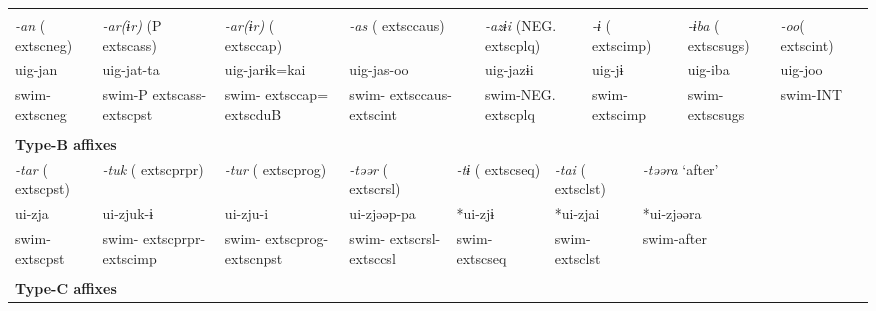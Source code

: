 \tabletail{}
\tablelasttail{}
\begin{tabularx}{\textwidth}{XXXXXXXXXXXXXXXXXXXX}
\lsptoprule
\multicolumn{20}{X}{{\bfseries Type-A affixes}}\\
{ \textit{{}-an} (	extsc{neg})} & \multicolumn{3}{X}{{ \textit{{}-ar(ɨr)} (P	extsc{ass})}} & \multicolumn{3}{X}{{ \textit{{}-ar(ɨr)} (	extsc{cap})}} & \multicolumn{4}{X}{{ \textit{{}-as} (	extsc{caus})}} & \multicolumn{4}{X}{{ \textit{{}-azɨi} (NEG.	extsc{plq})}} & \multicolumn{2}{X}{{ \textit{{}-ɨ} (	extsc{imp})}} & { \textit{{}-ɨba} (	extsc{sugs})} & { \textit{{}-oo}(	extsc{int})} & \\
{ uig-jan} & \multicolumn{3}{X}{{ uig-jat-ta}} & \multicolumn{3}{X}{{ uig-jarɨk=kai}} & \multicolumn{4}{X}{{ uig-jas-oo}} & \multicolumn{4}{X}{{ uig-jazɨi}} & \multicolumn{2}{X}{{ uig-jɨ}} & { uig-iba} & { uig-joo} & \\
swim-	extsc{neg} & \multicolumn{3}{X}{swim-P	extsc{ass}-	extsc{pst}} & \multicolumn{3}{X}{swim-	extsc{cap}=	extsc{du}B} & \multicolumn{4}{X}{swim-	extsc{caus}-	extsc{int}} & \multicolumn{4}{X}{swim-NEG.	extsc{plq}} & \multicolumn{2}{X}{swim-	extsc{imp}} & swim-	extsc{sugs} & swim-INT & \\
\multicolumn{20}{X}{}\\
\multicolumn{20}{X}{{\bfseries Type-B affixes}}\\
{ \textit{{}-tar} (	extsc{pst})} & \multicolumn{3}{X}{{ \textit{{}-tuk} (	extsc{prpr})}} & \multicolumn{3}{X}{{ \textit{{}-tur} (	extsc{prog})}} & \multicolumn{3}{X}{{ \textit{{}-təər} (	extsc{rsl})}} & \multicolumn{3}{X}{{ \textit{{}-tɨ} (	extsc{seq})}} & \multicolumn{3}{X}{{ \textit{{}-tai} (	extsc{lst})}} & \multicolumn{4}{X}{{ \textit{{}-təəra} ‘after’}}\\
{ ui-zja} & \multicolumn{3}{X}{{ ui-zjuk-ɨ}} & \multicolumn{3}{X}{{ ui-zju-i}} & \multicolumn{3}{X}{{ ui-zjəəp-pa}} & \multicolumn{3}{X}{{ *ui-zjɨ}} & \multicolumn{3}{X}{{ *ui-zjai}} & \multicolumn{4}{X}{{ *ui-zjəəra}}\\
swim-	extsc{pst} & \multicolumn{3}{X}{swim-	extsc{prpr}-	extsc{imp}} & \multicolumn{3}{X}{swim-	extsc{prog}-	extsc{npst}} & \multicolumn{3}{X}{swim-	extsc{rsl}-	extsc{csl}} & \multicolumn{3}{X}{swim-	extsc{seq}} & \multicolumn{3}{X}{swim-	extsc{lst}} & \multicolumn{4}{X}{{ swim-after}}\\
& \multicolumn{3}{X}{} & \multicolumn{3}{X}{} & \multicolumn{3}{X}{} & \multicolumn{3}{X}{} & \multicolumn{3}{X}{} & \multicolumn{4}{X}{}\\
\multicolumn{20}{X}{{\bfseries Type-C affixes}}\\

\end{tabularx}
